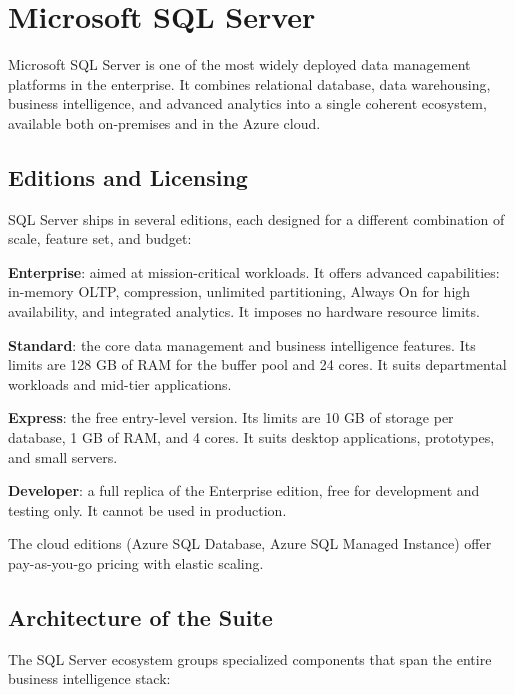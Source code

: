 
\section{Microsoft SQL Server}
\label{part:sql-server}

Microsoft SQL Server is one of the most widely deployed data management platforms in the enterprise. It combines relational database, data warehousing, business intelligence, and advanced analytics into a single coherent ecosystem, available both on-premises and in the Azure cloud.

\subsection{Editions and Licensing}
\label{sec:sql-server-editions}

SQL Server ships in several editions, each designed for a different combination of scale, feature set, and budget:

\begin{notebox}
\textbf{Enterprise}: aimed at mission-critical workloads. It offers advanced capabilities: in-memory OLTP, compression, unlimited partitioning, Always On for high availability, and integrated analytics. It imposes no hardware resource limits.

\textbf{Standard}: the core data management and business intelligence features. Its limits are 128 GB of RAM for the buffer pool and 24 cores. It suits departmental workloads and mid-tier applications.

\textbf{Express}: the free entry-level version. Its limits are 10 GB of storage per database, 1 GB of RAM, and 4 cores. It suits desktop applications, prototypes, and small servers.

\textbf{Developer}: a full replica of the Enterprise edition, free for development and testing only. It cannot be used in production.
\end{notebox}

The cloud editions (Azure SQL Database, Azure SQL Managed Instance) offer pay-as-you-go pricing with elastic scaling.

\subsection{Architecture of the Suite}
\label{sec:sql-server-architecture}

The SQL Server ecosystem groups specialized components that span the entire business intelligence stack:

